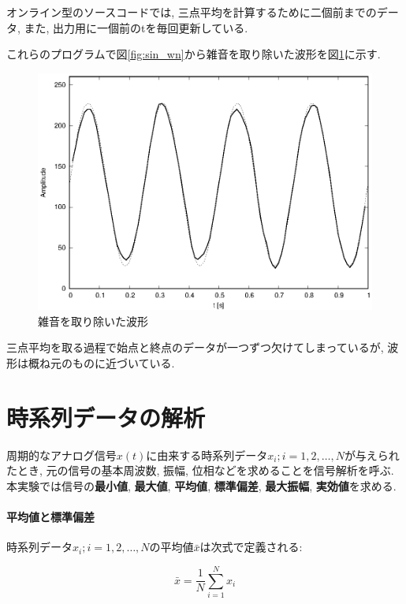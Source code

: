 \documentclass[titlepage]{jsarticle}
\begin{document}
        オンライン型のソースコードでは, 三点平均を計算するために二個前までのデータ,
        また, 出力用に一個前のtを毎回更新している.

        これらのプログラムで図\ref{fig:sin_wn}から雑音を取り除いた波形を図\ref{fig:mvave}に示す.

        \begin{figure}[ht]
            \centering
            \includegraphics[width=12cm]{images/mvave.eps}
            \caption{雑音を取り除いた波形}
            \label{fig:mvave}
        \end{figure}

        三点平均を取る過程で始点と終点のデータが一つずつ欠けてしまっているが,
        波形は概ね元のものに近づいている.

\section{時系列データの解析}
    周期的なアナログ信号$x(t)$に由来する時系列データ$x_i;i=1,2,\dots,N$が与えられたとき,
    元の信号の基本周波数, 振幅, 位相などを求めることを信号解析を呼ぶ.
    本実験では信号の\textbf{最小値}, \textbf{最大値}, \textbf{平均値}, \textbf{標準偏差}, \textbf{最大振幅}, \textbf{実効値}を求める.

    \paragraph{平均値と標準偏差} 時系列データ$x_i;i=1,2,\dots,N$の平均値$\bar{x}$は次式で定義される:
        
        \begin{equation} \label{eqn:mean}
            \bar{x} = \frac{1}{N} \sum_{i=1}^{N} x_i
        \end{equation}
\end{document}
